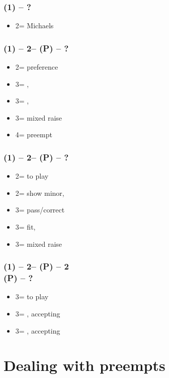 \subsubsection*{(1\diams) -- ?}
\begin{itemize}
    \item 2\diams = Michaels
\end{itemize}

\subsubsection*{(1\diams) -- 2\diams -- (P) -- ?}
\begin{itemize}
    \item 2\major = preference
    \item 3\clubs = \hearts, \invp
    \item 3\diams = \spades, \invp
    \item 3\major = mixed raise
    \item 4\major = preempt
\end{itemize}

\subsubsection*{(1\hearts) -- 2\hearts -- (P) -- ?}
\begin{itemize}
    \item 2\spades = to play
    \item 2\nt = show minor, \invp
    \item 3\clubs = pass/correct
    \item 3\diams = \spades fit, \invp
    \item 3\spades = mixed raise
\end{itemize}

\subsubsection*{(1\hearts) -- 2\hearts -- (P) -- 2\nt\\
                (P) -- ?}
\begin{itemize}
    \item 3\minor = to play
    \item 3\hearts = \clubs, accepting \inv
    \item 3\spades = \diams, accepting \inv
\end{itemize}

\section{\texorpdfstring{Dealing with preempts}{dealingWithPreempts}}\label{sec:dealingWithPreempts}


